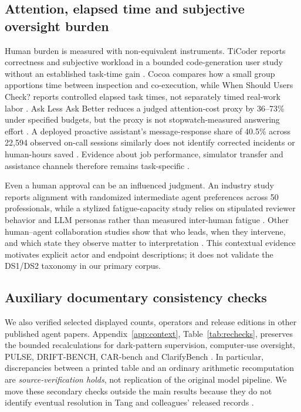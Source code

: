 \subsection{Attention, elapsed time and subjective oversight burden}
Human burden is measured with non-equivalent instruments. TiCoder reports correctness and subjective workload in a bounded code-generation user study without an established task-time gain \cite{ref18}. Cocoa compares how a small group apportions time between inspection and co-execution, while When Should Users Check? reports controlled elapsed task times, not separately timed real-work labor \cite{ref19,ref17}. Ask Less Ask Better reduces a judged attention-cost proxy by 36--73\% under specified budgets, but the proxy is not stopwatch-measured answering effort \cite{ref20}. A deployed proactive assistant's message-response share of 40.5\% across 22,594 observed on-call sessions similarly does not identify corrected incidents or human-hours saved \cite{ref45}. Evidence about job performance, simulator transfer and assistance channels therefore remains task-specific \cite{ref21,ref44}.

Even a human approval can be an influenced judgment. An industry study reports alignment with randomized intermediate agent preferences across 50 professionals, while a stylized fatigue-capacity study relies on stipulated reviewer behavior and LLM personas rather than measured inter-human fatigue \cite{ref37,ref46}. Other human--agent collaboration studies show that who leads, when they intervene, and which state they observe matter to interpretation \cite{ref43,ref34}. This contextual evidence motivates explicit actor and endpoint descriptions; it does not validate the DS1/DS2 taxonomy in our primary corpus.

\subsection{Auxiliary documentary consistency checks}\label{sec:audit}
We also verified selected displayed counts, operators and release editions in other published agent papers. Appendix~\ref{app:context}, Table~\ref{tab:rechecks}, preserves the bounded recalculations for dark-pattern supervision, computer-use oversight, PULSE, DRIFT-BENCH, CAR-bench and ClarifyBench \cite{ref22,ref16,ref36,ref28,ref40,ref41}. In particular, discrepancies between a printed table and an ordinary arithmetic recomputation are \emph{source-verification holds}, not replication of the original model pipeline. We move these secondary checks outside the main results because they do not identify eventual resolution in Tang and colleagues' released records \cite{ref35}.

